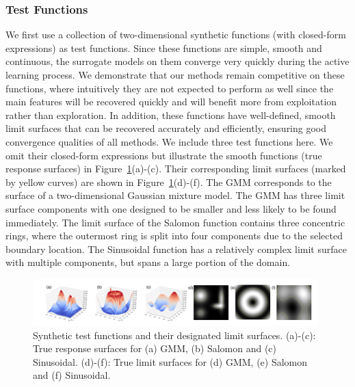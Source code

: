 \subsubsection{Test Functions}
We first use a collection of two-dimensional synthetic functions (with closed-form expressions) as test functions.
%
Since these functions are simple, smooth and continuous, the surrogate models on them converge very quickly during the active learning process.
%
We demonstrate that our methods remain competitive on these functions, where intuitively they are not expected to perform as well since the main features will be recovered quickly and will benefit more from exploitation rather than exploration.
%
In addition, these functions have well-defined, smooth limit surfaces that can be recovered accurately and efficiently, ensuring good convergence qualities of all methods.
%
We include three test functions here.
%
We omit their closed-form expressions but illustrate the smooth functions (true response surfaces) in Figure~\ref{fig:synthetic}(a)-(c).
%
Their corresponding limit surfaces (marked by yellow curves) are shown in Figure~\ref{fig:synthetic}(d)-(f).
%
The GMM corresponds to the surface of a two-dimensional Gaussian mixture model.
%
The GMM has three limit surface components with one designed to be smaller and less likely to be found immediately.
%
The limit surface of the Salomon function contains three concentric rings, where the outermost ring is split into four components due to the selected boundary location.
%
The Sinusoidal function has a relatively complex limit surface with multiple components, but spans a large portion of the domain.

\begin{figure}[!ht]
\centering
\includegraphics[width=0.98\textwidth]{figs/chap5/synthetic}
\caption[Test functions for batch adaptive sampling]{Synthetic test functions and their designated limit surfaces.
(a)-(c): True response surfaces for (a) GMM, (b) Salomon and (c) Sinusoidal.
(d)-(f): True limit surfaces for (d) GMM, (e) Salomon and (f) Sinusoidal.}
\label{fig:synthetic}
\end{figure}

